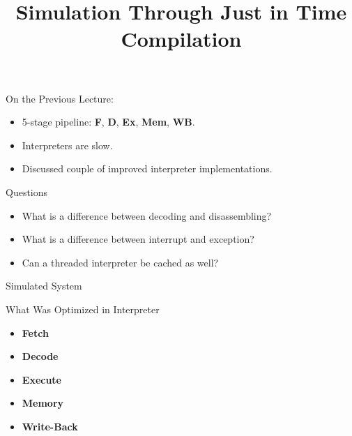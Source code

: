 

\usepackage{tikz}
\usetikzlibrary{shapes, calc, arrows, decorations.markings, decorations.pathreplacing, decorations.pathmorphing, decorations, patterns, chains, snakes, backgrounds, positioning, fit, shadows}

\title{Simulation Through Just in Time Compilation}



\startslides

\begin{frame}{On the Previous Lecture:}
\begin{itemize}
\item 5-stage pipeline: \textbf{F}, \textbf{D}, \textbf{Ex}, \textbf{Mem},
  \textbf{WB}.
\item Interpreters are slow.
\item Discussed couple of improved interpreter implementations.
\end{itemize}
\end{frame}

\begin{frame}{Questions}
\begin{itemize}
\item What is a difference between decoding and disassembling?\pause
\item What is a difference between interrupt and exception?\pause
\item Can a threaded interpreter be cached as well?
\end{itemize}
\end{frame}

\begin{frame}{Simulated System}
\centering
\vfill
{}
\vfill
\end{frame}

\begin{frame}{What Was Optimized in Interpreter}
\begin{itemize}
\item \textbf<1>{Fetch} \only<1>{$\leftarrow$ optimized}
\item \textbf<1>{Decode} 
\item \textbf<2>{Execute} 
\item \textbf<2>{Memory} 
\item \textbf<2>{Write-Back} 
\end{itemize}
\end{frame}

